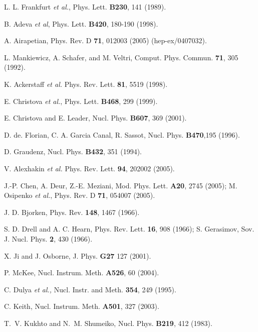 \documentclass[12pt]{article}
\begin{document}
\begin{thebibliography}{99}
 L. L. Frankfurt {\it et al.}, Phys. Lett. {\bf B230}, 141 (1989).

 B. Adeva {\it et al}, Phys. Lett. {\bf B420}, 180-190 (1998).

 A. Airapetian, Phys. Rev. D {\bf 71}, 012003 (2005) (hep-ex/0407032).

L. Mankiewicz, A. Schafer, and M. Veltri, 
Comput. Phys. Commun. {\bf 71}, 305 (1992).

K. Ackerstaff {\it et al.} Phys. Rev. Lett. {\bf 81}, 5519 (1998).    

 E. Christova {\it et al.}, Phys. Lett. {\bf B468},  299 (1999).

 E. Christova and E. Leader, Nucl. Phys. {\bf B607}, 369 (2001).

 D. de. Florian, C. A. Garcia Canal,
R. Sassot, Nucl. Phys. {\bf B470},195 (1996).

 D. Graudenz, Nucl. Phys. {\bf B432}, 351 (1994).

V. Alexhakin {\it et al.} Phys. Rev. Lett. {\bf 94}, 202002
(2005).



J.-P. Chen, A. Deur, Z.-E. Meziani, Mod. Phys. Lett. \textbf{A20}, 2745 (2005);
M. Osipenko {\it et al.}, Phys. Rev. D {\bf 71}, 054007 (2005).

J. D. Bjorken, Phys. Rev. \textbf{148}, 1467 (1966).

S. D. Drell and
A. C. Hearn, Phys. Rev. Lett. \textbf{16}, 908 (1966);
S. Gerasimov, Sov. J. Nucl. Phys. \textbf{2}, 430 (1966).

X. Ji and J. Osborne, J. Phys. {\bf G27} 127 (2001).


 P. McKee, Nucl. Instrum. Meth. {\bf A526}, 60 (2004).

C. Dulya {\it et al.,}
Nucl. Instr. and Meth. {\bf  354}, 249 (1995).

 C. Keith, Nucl. Instrum. Meth. {\bf A501}, 327 (2003).


T.~V. Kukhto and N.~M. Shumeiko,
Nucl. Phys. {\bf B219},
412 (1983).


\end{thebibliography}
\end{document}
